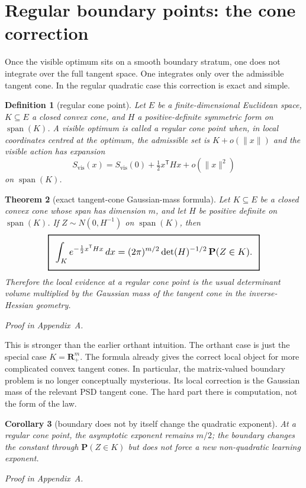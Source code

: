 \documentclass[11pt,a4paper]{article}
\numberwithin{equation}{section}
\DeclareMathOperator{\spanop}{span}
\newcommand{\R}{\mathbf R}
\newcommand{\Prob}{\mathbf P}
\newcommand{\geomboxed}[1]{%
  \setlength{\fboxsep}{8pt}%
  \setlength{\fboxrule}{0.9pt}%
  \fbox{\scalebox{1.12}{$\displaystyle #1$}}%
}
\theoremstyle{thmcompact}
\newtheorem{theorem}{Theorem}[section]
\newtheorem{corollary}[theorem]{Corollary}
\newtheorem{definition}[theorem]{Definition}
\theoremstyle{remark}
\newcommand{\proofappendix}{\par{\hfill\scriptsize\emph{Proof in Appendix~A.}}\par}
\begin{document}
\section{Regular boundary points: the cone correction}

Once the visible optimum sits on a smooth boundary stratum, one does not integrate over the full tangent space. One integrates only over the admissible tangent cone. In the regular quadratic case this correction is exact and simple.

\begin{definition}[regular cone point]
Let $E$ be a finite-dimensional Euclidean space, $K\subseteq E$ a closed convex cone, and $H$ a positive-definite symmetric form on $\spanop(K)$. A visible optimum is called a \emph{regular cone point} when, in local coordinates centred at the optimum, the admissible set is $K+o(\|x\|)$ and the visible action has expansion
\[
S_{\mathrm{vis}}(x)=S_{\mathrm{vis}}(0)+\tfrac12 x^{\mathsf T}Hx+o(\|x\|^2)
\]
on $\spanop(K)$.
\end{definition}

\begin{theorem}[exact tangent-cone Gaussian-mass formula]
Let $K\subseteq E$ be a closed convex cone whose span has dimension $m$, and let $H$ be positive definite on $\spanop(K)$. If $Z\sim N(0,H^{-1})$ on $\spanop(K)$, then
\[
\geomboxed{
\int_K e^{-\frac12 x^{\mathsf T}Hx}\,dx
=
(2\pi)^{m/2}\det(H)^{-1/2}\,\Prob(Z\in K).}
\]
Therefore the local evidence at a regular cone point is the usual determinant volume multiplied by the Gaussian mass of the tangent cone in the inverse-Hessian geometry.\proofappendix
\end{theorem}

This is stronger than the earlier orthant intuition. The orthant case is just the special case $K=\R_+^m$. The formula already gives the correct local object for more complicated convex tangent cones. In particular, the matrix-valued boundary problem is no longer conceptually mysterious. Its local correction is the Gaussian mass of the relevant PSD tangent cone. The hard part there is computation, not the form of the law.

\begin{corollary}[boundary does not by itself change the quadratic exponent]
At a regular cone point, the asymptotic exponent remains $m/2$; the boundary changes the constant through $\Prob(Z\in K)$ but does not force a new non-quadratic learning exponent.\proofappendix
\end{corollary}
\end{document}
